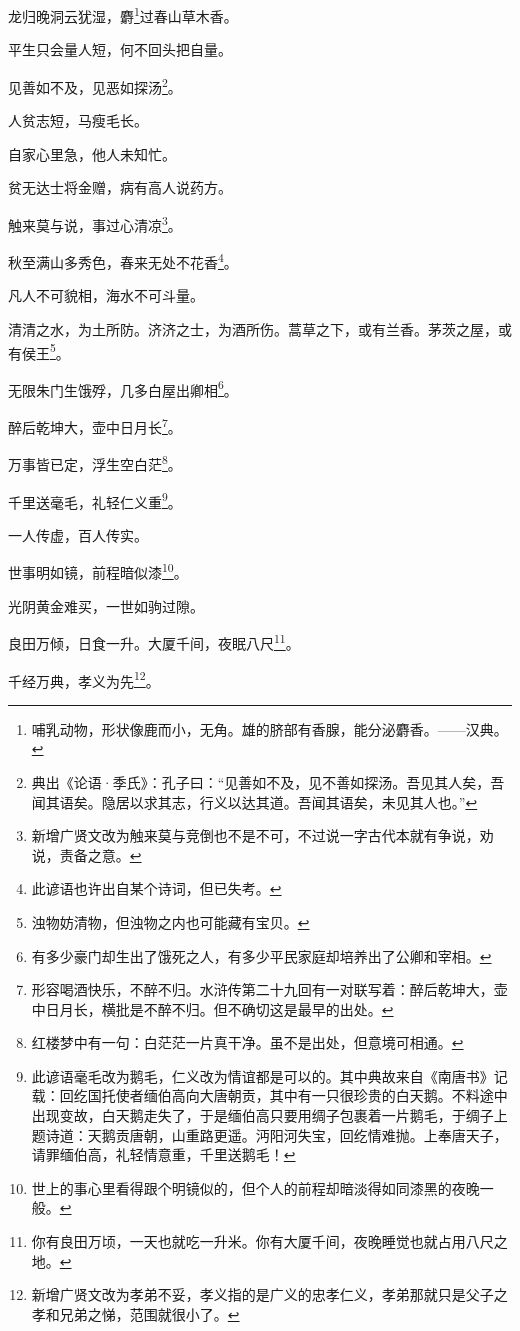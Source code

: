 \documentclass[12pt,oneside]{book}
\begin{document}
龙归晚洞云犹湿，麝\footnote{哺乳动物，形状像鹿而小，无角。雄的脐部有香腺，能分泌麝香。——汉典。}过春山草木香。

平生只会量人短，何不回头把自量。

见善如不及，见恶如探汤\footnote{典出《论语·季氏》：孔子曰：“见善如不及，见不善如探汤。吾见其人矣，吾闻其语矣。隐居以求其志，行义以达其道。吾闻其语矣，未见其人也。”}。

人贫志短，马瘦毛长。

自家心里急，他人未知忙。

贫无达士将金赠，病有高人说药方。

触来莫与说，事过心清凉\footnote{新增广贤文改为触来莫与竞倒也不是不可，不过说一字古代本就有争说，劝说，责备之意。}。

秋至满山多秀色，春来无处不花香\footnote{此谚语也许出自某个诗词，但已失考。}。

凡人不可貌相，海水不可斗量。

清清之水，为土所防。济济之士，为酒所伤。蒿草之下，或有兰香。茅茨之屋，或有侯王\footnote{浊物妨清物，但浊物之内也可能藏有宝贝。}。

无限朱门生饿殍，几多白屋出卿相\footnote{有多少豪门却生出了饿死之人，有多少平民家庭却培养出了公卿和宰相。}。

醉后乾坤大，壶中日月长\footnote{形容喝酒快乐，不醉不归。水浒传第二十九回有一对联写着：醉后乾坤大，壶中日月长，横批是不醉不归。但不确切这是最早的出处。}。

万事皆已定，浮生空白茫\footnote{红楼梦中有一句：白茫茫一片真干净。虽不是出处，但意境可相通。}。

千里送毫毛，礼轻仁义重\footnote{此谚语毫毛改为鹅毛，仁义改为情谊都是可以的。其中典故来自《南唐书》记载：回纥国托使者缅伯高向大唐朝贡，其中有一只很珍贵的白天鹅。不料途中出现变故，白天鹅走失了，于是缅伯高只要用绸子包裹着一片鹅毛，于绸子上题诗道：天鹅贡唐朝，山重路更遥。沔阳河失宝，回纥情难抛。上奉唐天子，请罪缅伯高，礼轻情意重，千里送鹅毛！}。

一人传虚，百人传实。

世事明如镜，前程暗似漆\footnote{世上的事心里看得跟个明镜似的，但个人的前程却暗淡得如同漆黑的夜晚一般。}。

光阴黄金难买，一世如驹过隙。

良田万倾，日食一升。大厦千间，夜眠八尺\footnote{你有良田万顷，一天也就吃一升米。你有大厦千间，夜晚睡觉也就占用八尺之地。}。

千经万典，孝义为先\footnote{新增广贤文改为孝弟不妥，孝义指的是广义的忠孝仁义，孝弟那就只是父子之孝和兄弟之悌，范围就很小了。}。
\end{document}
